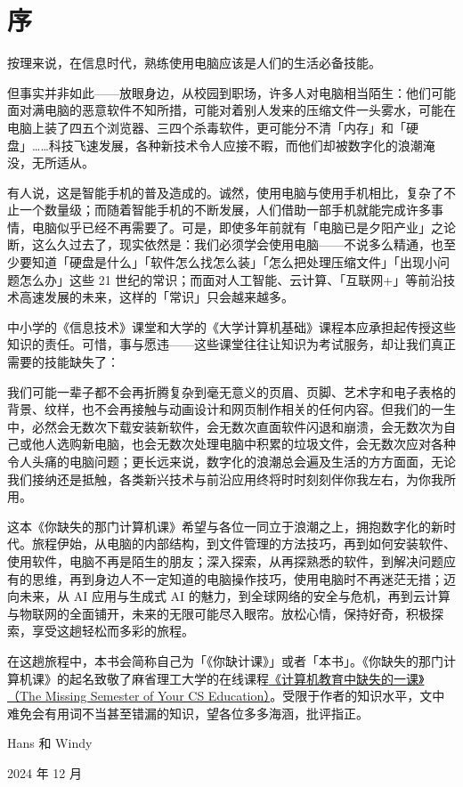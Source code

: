 \chapter{序}
\label{cha:premble}

按理来说，在信息时代，熟练使用电脑应该是人们的生活必备技能。

但事实并非如此——放眼身边，从校园到职场，许多人对电脑相当陌生：他们可能面对满电脑的恶意软件不知所措，可能对着别人发来的压缩文件一头雾水，可能在电脑上装了四五个浏览器、三四个杀毒软件，更可能分不清「内存」和「硬盘」……科技飞速发展，各种新技术令人应接不暇，而他们却被数字化的浪潮淹没，无所适从。

有人说，这是智能手机的普及造成的。诚然，使用电脑与使用手机相比，复杂了不止一个数量级；而随着智能手机的不断发展，人们借助一部手机就能完成许多事情，电脑似乎已经不再需要了。可是，即使多年前就有「电脑已是夕阳产业」之论断，这么久过去了，现实依然是：我们必须学会使用电脑——不说多么精通，也至少要知道「硬盘是什么」「软件怎么找怎么装」「怎么把处理压缩文件」「出现小问题怎么办」这些 21 世纪的常识；而面对人工智能、云计算、「互联网+」等前沿技术高速发展的未来，这样的「常识」只会越来越多。

中小学的《信息技术》课堂和大学的《大学计算机基础》课程本应承担起传授这些知识的责任。可惜，事与愿违——这些课堂往往让知识为考试服务，却让我们真正需要的技能缺失了：

我们可能一辈子都不会再折腾复杂到毫无意义的页眉、页脚、艺术字和电子表格的背景、纹样，也不会再接触与动画设计和网页制作相关的任何内容。但我们的一生中，必然会无数次下载安装新软件，会无数次直面软件闪退和崩溃，会无数次为自己或他人选购新电脑，也会无数次处理电脑中积累的垃圾文件，会无数次应对各种令人头痛的电脑问题；更长远来说，数字化的浪潮总会遍及生活的方方面面，无论我们接纳还是抵触，各类新兴技术与前沿应用终将时时刻刻伴你我左右，为你我所用。

这本《你缺失的那门计算机课》希望与各位一同立于浪潮之上，拥抱数字化的新时代。旅程伊始，从电脑的内部结构，到文件管理的方法技巧，再到如何安装软件、使用软件，电脑不再是陌生的朋友；深入探索，从再探熟悉的软件，到解决问题应有的思维，再到身边人不一定知道的电脑操作技巧，使用电脑时不再迷茫无措；迈向未来，从 AI 应用与生成式 AI 的魅力，到全球网络的安全与危机，再到云计算与物联网的全面铺开，未来的无限可能尽入眼帘。放松心情，保持好奇，积极探索，享受这趟轻松而多彩的旅程。

在这趟旅程中，本书会简称自己为「《你缺计课》」或者「本书」。《你缺失的那门计算机课》的起名致敬了麻省理工大学的在线课程\href{https://missing.csail.mit.edu/}{《计算机教育中缺失的一课》（The Missing Semester of Your CS Education）}。受限于作者的知识水平，文中难免会有用词不当甚至错漏的知识，望各位多多海涵，批评指正。

\hfill Hans 和 Windy

\hfill 2024 年 12 月